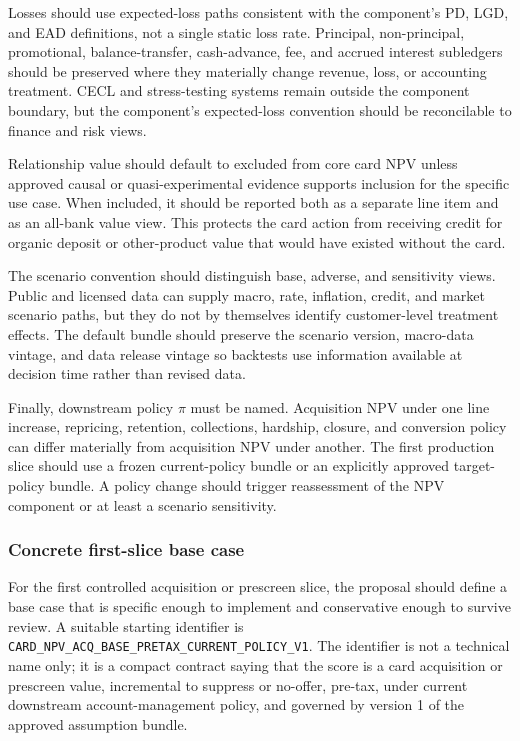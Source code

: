 \documentclass[11pt]{article}
\newcommand{\1}{\mathbf{1}}
\newcommand{\code}[1]{\nolinkurl{#1}}
\begin{document}
Losses should use expected-loss paths consistent with the component's PD, LGD,
and EAD definitions, not a single static loss rate. Principal,
non-principal, promotional, balance-transfer, cash-advance, fee, and accrued
interest subledgers should be preserved where they materially change revenue,
loss, or accounting treatment. CECL and stress-testing systems remain outside
the component boundary, but the component's expected-loss convention should be
reconcilable to finance and risk views.

Relationship value should default to excluded from core card NPV unless
approved causal or quasi-experimental evidence supports inclusion for the
specific use case. When included, it should be reported both as a separate
line item and as an all-bank value view. This protects the card action from
receiving credit for organic deposit or other-product value that would have
existed without the card.

The scenario convention should distinguish base, adverse, and sensitivity
views. Public and licensed data can supply macro, rate, inflation, credit, and
market scenario paths, but they do not by themselves identify customer-level
treatment effects. The default bundle should preserve the scenario version,
macro-data vintage, and data release vintage so backtests use information
available at decision time rather than revised data.

Finally, downstream policy $\pi$ must be named. Acquisition NPV under one line
increase, repricing, retention, collections, hardship, closure, and conversion
policy can differ materially from acquisition NPV under another. The first
production slice should use a frozen current-policy bundle or an explicitly
approved target-policy bundle. A policy change should trigger reassessment of
the NPV component or at least a scenario sensitivity.

\subsubsection{Concrete first-slice base case}
\label{subsec:first-slice-valuation-base}

For the first controlled acquisition or prescreen slice, the proposal should
define a base case that is specific enough to implement and conservative
enough to survive review. A suitable starting identifier is
\code{CARD_NPV_ACQ_BASE_PRETAX_CURRENT_POLICY_V1}. The identifier is not a
technical name only; it is a compact contract saying that the score is a card
acquisition or prescreen value, incremental to suppress or no-offer, pre-tax,
under current downstream account-management policy, and governed by version 1
of the approved assumption bundle.
\end{document}
